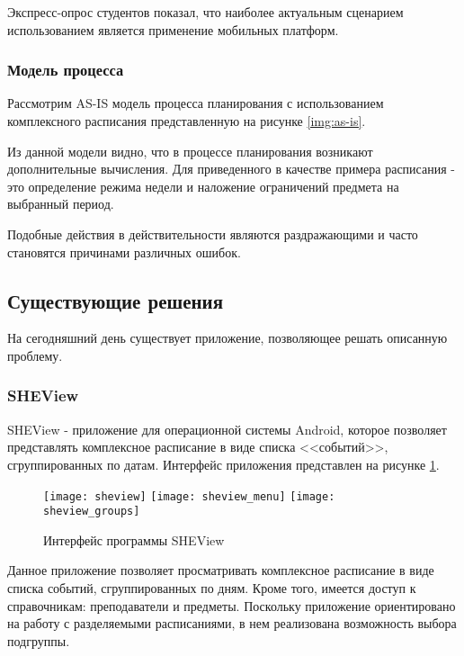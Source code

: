 Экспресс-опрос студентов показал, что наиболее актуальным сценарием использованием является применение мобильных платформ.

\subsubsection{Модель процесса}

Рассмотрим AS-IS модель процесса планирования с использованием комплексного расписания представленную на рисунке \ref{img:as-is}.


Из данной модели видно, что в процессе планирования возникают дополнительные вычисления.
Для приведенного в качестве примера расписания - это определение режима недели и наложение ограничений предмета на выбранный период.

Подобные действия в действительности являются раздражающими и часто становятся причинами различных ошибок.

\subsection{Существующие решения}

На сегодняшний день существует приложение, позволяющее решать описанную проблему.

\subsubsection{SHEView}

SHEView - приложение для операционной системы Android, которое позволяет представлять комплексное расписание в виде списка <<событий>>, сгруппированных по датам.
Интерфейс приложения представлен на рисунке \ref{img:sheview}.

\begin{figure}[!tb]
      \texttt{[image: sheview]}
  \endminipage\hfill
      \texttt{[image: sheview\_menu]}
  \endminipage\hfill
      \texttt{[image: sheview\_groups]}
  \endminipage
  \caption{Интерфейс программы SHEView} \label{img:sheview}
\end{figure}

Данное приложение позволяет просматривать комплексное расписание в виде списка событий, сгруппированных по дням.
Кроме того, имеется доступ к справочникам: преподаватели и предметы.
Поскольку приложение ориентировано на работу с разделяемыми расписаниями, в нем реализована возможность выбора подгруппы.

